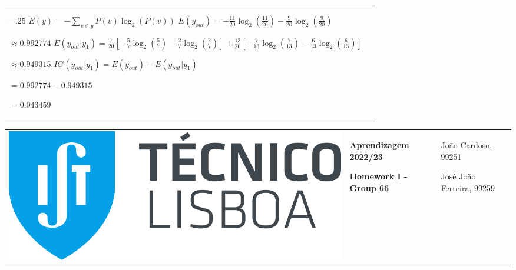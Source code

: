 \documentclass[11pt,a4paper]{article}
\begin{document}
\begin{flushleft}
\begin{tabularx}{1.09\textwidth}{>{\hsize=.25\hsize}X X}
    \normalsize\vspace{5mm}
    $ E(y) = -\sum_{v \in y} P(v)\log_2(P(v)) $
    \newline\newline
    $ E(y_{out}) = -\frac{11}{20}\log_2(\frac{11}{20}) -\frac{9}{20}\log_2(\frac{9}{20}) $ \par\vspace{1mm}
    \hspace{12.25mm} $ \approx 0.992774 $
    \newline\newline
    $ E(y_{out}|y_1) = \frac{7}{20}[-\frac{5}{7}\log_2(\frac{5}{7}) -\frac{2}{7}\log_2(\frac{2}{7})] + \frac{13}{20}[-\frac{7}{13}\log_2(\frac{7}{13}) -\frac{6}{13}\log_2(\frac{6}{13})] $ \par\vspace{1mm}
    \hspace{16.75mm} $ \approx 0.949315 $
    \newline\newline
    $ IG(y_{out}|y_1) = E(y_{out}) - E(y_{out}|y_1) $ \par\vspace{1mm}
    \hspace{18.75mm} $ = 0.992774 - 0.949315 $ \par\vspace{1mm}
    \hspace{18.75mm} $ = 0.043459 $
  \end{tabularx}
\end{flushleft}

\pagebreak

\color{darkgray}
\hspace{-8.25mm}
\begin{tabularx}{1.09\textwidth} {>{\raggedright\arraybackslash}X >{\centering\arraybackslash}X >{\raggedleft\arraybackslash}X}
  \includegraphics[scale=0.2]{tecnico.pdf}                          &
  \textbf{Aprendizagem 2022/23} \par \textbf{Homework I - Group 66} &
  João Cardoso, 99251 \par José João Ferreira, 99259
\end{tabularx}
\color{black}
\end{document}
